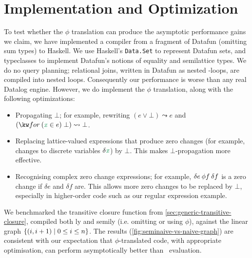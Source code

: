 \section{Implementation and Optimization}
\label{sec:implementation}

\newcommand\rewrites\leadsto

To test whether the $\phi$ translation can produce the asymptotic performance
gains we claim, we have implemented a compiler from a fragment of Datafun
(omitting sum types) to Haskell.
%
We use Haskell's \texttt{Data.Set} to represent Datafun sets, and
typeclasses to implement Datafun's notions of equality and semilattice types.
%
We do no query planning; relational joins, written in Datafun as nested
-loops, are compiled into nested loops.
%
Consequently our performance is worse than any real Datalog engine.
%
However, we do implement the $\phi$ translation, along with the following
optimizations:

\begin{itemize}
\item Propagating $\bot$; for example, rewriting $(e \vee \bot) \rewrites e$ and
  $(\efor{x}{e} \bot) \rewrites \bot$. %

\item Replacing lattice-valued expressions that produce zero changes (for
  example, changes to discrete variables $\delta \dvar x$) by $\bot$. This makes
  $\bot$-propagation more effective.

\item Recognising complex zero change expressions; for example, $\delta e \<\phi
  f \<\delta f$ is a zero change if $\delta e$ and $\delta f$ are. This allows
  more zero changes to be replaced by $\bot$, especially in higher-order code
  such as our regular expression example. 
\end{itemize}



We benchmarked the transitive closure function  from
\cref{sec:generic-transitive-closure}, compiled both \naive{}ly and
semi\naive{}ly (i.e. omitting or using $\phi$), against the linear graph
$\{(i,i+1) \mathrel{|} 0 \le i \le n\}$. The results
(\cref{fig:seminaive-vs-naive-graph}) are consistent with our expectation that
$\phi$-translated code, with appropriate optimisation, can perform
asymptotically better than \naive\ evaluation.


